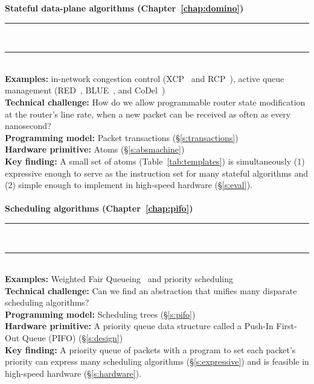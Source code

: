 \begin{table}
\textbf{Stateful data-plane algorithms (Chapter~\ref{chap:domino})}
\\[-7pt]\rule{\textwidth}{1pt}\\[-7pt]\rule{\textwidth}{1pt} \\
\textbf{Examples:} in-network congestion control (\eg XCP~\cite{xcp} and
RCP~\cite{rcp}), active queue management (\eg RED~\cite{red}, BLUE~\cite{blue},
and CoDel~\cite{codel}) \\
\textbf{Technical challenge:} How do we allow programmable router state
modification at the router's line rate, when a new packet can be received as
often as every nanosecond? \\
\textbf{Programming model:} Packet transactions (\S\ref{s:transactions})\\
\textbf{Hardware primitive:} Atoms (\S\ref{s:absmachine}) \\
\textbf{Key finding:} A small set of atoms (Table~\ref{tab:templates}) is
simultaneously (1) expressive enough to serve as the instruction set for many
stateful algorithms and (2) simple enough to implement in high-speed hardware
(\S\ref{s:eval}). \\ \\

\textbf{Scheduling algorithms (Chapter~\ref{chap:pifo})}
\\[-7pt]\rule{\textwidth}{1pt}\\[-7pt]\rule{\textwidth}{1pt} \\
\textbf{Examples:} Weighted Fair Queueing~\cite{wfq} and priority scheduling~\cite{srpt} \\
\textbf{Technical challenge:} Can we find an abstraction that unifies many disparate
scheduling algorithms? \\
\textbf{Programming model:} Scheduling trees (\S\ref{s:pifo}) \\
\textbf{Hardware primitive:} A priority queue data structure called a Push-In First-Out
Queue (PIFO) (\S\ref{s:design}) \\
\textbf{Key finding:} A priority queue of packets with a program to set each
packet's priority can express many scheduling algorithms
(\S\ref{s:expressive}) and is feasible in high-speed hardware
(\S\ref{s:hardware}). \\\\


\end{table}

